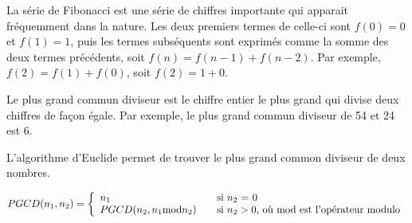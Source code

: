 \documentclass[11pt,addpoints]{exam}
\begin{document}
\begin{questions}

\question
La série de Fibonacci est une série de chiffres importante qui apparait fréquemment dans la nature. Les deux premiers termes de celle-ci sont $f(0)=0$ et $f(1)=1$, puis les termes subséquents sont exprimés comme la somme des deux termes précédents, soit $f(n) = f(n-1) + f(n-2)$. Par exemple, $f(2)=f(1) + f(0)$, soit $f(2)=1+0$.

\question
Le plus grand commun diviseur est le chiffre entier le plus grand qui divise deux chiffres de façon égale. Par exemple, le plus grand commun diviseur de 54 et 24 est 6.

L'algorithme d'Euclide permet de trouver le plus grand common diviseur de deux nombres.

\[ PGCD(n_1, n_2) = \left\{ 
  \begin{array}{l l}
    n_1 & \quad \textrm{si $n_2$ = 0}\\
    PGCD(n_2, n_1 \mathrm{mod} n_2) & \quad \textrm{si $n_2 > 0$, où $\mathrm{mod}$ est l'opérateur modulo}
  \end{array} \right.\]


\end{questions}
\end{document}
